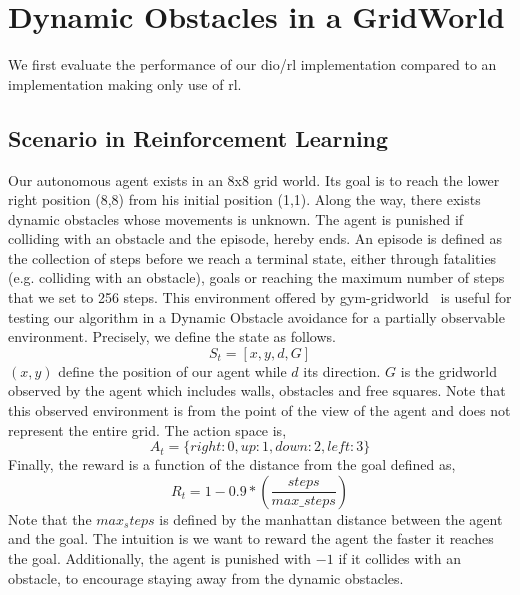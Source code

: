\section{Dynamic Obstacles in a GridWorld} 
We first evaluate the performance of our dio/rl implementation compared to an implementation making only use of rl. 

\subsection{Scenario in Reinforcement Learning}

Our autonomous agent exists in an 8x8 grid world. Its goal is to reach
the lower right position (8,8) from his initial position (1,1).
Along the way, there exists dynamic obstacles whose movements is
unknown. The agent is punished if colliding with an obstacle and the
\gls{episode}, hereby ends. An episode is defined as the collection of steps before we reach a terminal state, either 
through fatalities (e.g. colliding with an obstacle), goals or reaching the maximum number of steps that we set to 256 steps.
This environment offered by gym-gridworld~\cite{gym_minigrid} is useful for testing our algorithm in a Dynamic Obstacle avoidance for a partially observable 
environment. Precisely, we define the state as follows. 
\begin{equation*}
  S_t = [x, y, d, G]
\end{equation*}
$(x,y)$ define the position of our agent while $d$ its direction. $G$
is the gridworld observed by the agent which includes walls, obstacles
and free squares. Note that this observed environment is from the point of the view 
of the agent and does not represent the entire grid.  
The action space is, 
\begin{equation*}
  A_t = \{ right: 0, up: 1, down: 2, left: 3 \}
\end{equation*}
Finally, the reward is a function of the distance from the goal
defined as, 
\begin{equation*}
  R_t = 1 - 0.9*(\dfrac{steps}{max\_steps})
\end{equation*}
Note that the $max_steps$ is defined by the manhattan distance between the agent and the goal. The intuition is 
we want to reward the agent the faster it reaches the goal. Additionally, the agent is punished with $-1$ if it collides with 
an obstacle, to encourage staying away from the dynamic obstacles. 

